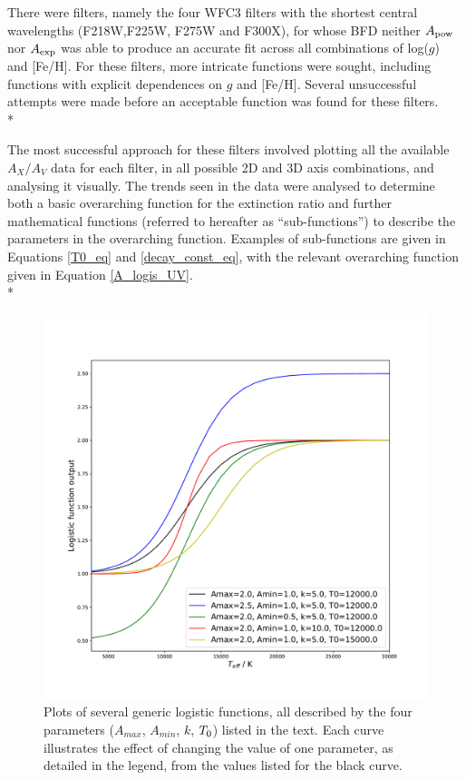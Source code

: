 \documentclass[12pt, a4paper]{report}
\begin{document}
There were filters, namely the four WFC3 filters with the shortest central wavelengths (F218W,F225W, F275W and F300X), for whose BFD neither $A_{\textnormal{pow}}$ nor $A_{\textnormal{exp}}$ was able to produce an accurate fit across all combinations of log($g$) and [Fe/H]. For these filters, more intricate functions were sought, including functions with explicit dependences on $g$ and [Fe/H]. Several unsuccessful attempts were made before an acceptable function was found for these filters.\\*

The most successful approach for these filters involved plotting all the available $A_{X}/A_{V}$ data for each filter, in all possible 2D and 3D axis combinations, and analysing it visually. The trends seen in the data were analysed to determine both a basic overarching function for the extinction ratio and further mathematical functions (referred to hereafter as ``sub-functions'') to describe the parameters in the overarching function. Examples of sub-functions are given in Equations \ref{T0_eq} and \ref{decay_const_eq}, with the relevant overarching function given in Equation \ref{A_logis_UV}.\\*

\begin{figure}[h!]
\begin{center}
\includegraphics[width=1.0\textwidth]{generic_logistic_params_illustration.pdf}
\caption{Plots of several generic logistic functions, all described by the four parameters ($A_{max}$, $A_{min}$, $k$, $T_{\textnormal{0}}$) listed in the text. Each curve illustrates the effect of changing the value of one parameter, as detailed in the legend, from the values listed for the black curve.}
\label{logistic_curve_example}
\end{center}
\end{figure}
\end{document}
